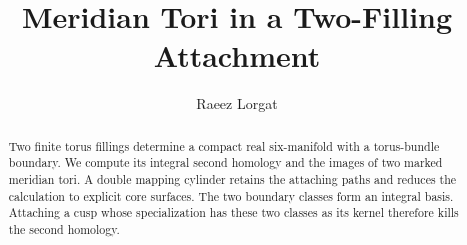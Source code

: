\documentclass[11pt]{article}
\title{Meridian Tori in a Two-Filling Attachment}
\author{Raeez Lorgat}
\date{}
\numberwithin{equation}{section}
\begin{document}
\maketitle
\begin{abstract}
Two finite torus fillings determine a compact real six-manifold with a
torus-bundle boundary. We compute its integral second homology and the
images of two marked meridian tori. A double mapping cylinder retains the
attaching paths and reduces the calculation to explicit core surfaces.
The two boundary classes form an integral basis. Attaching a cusp whose
specialization has these two classes as its kernel therefore kills the
second homology.
\end{abstract}

\end{document}
